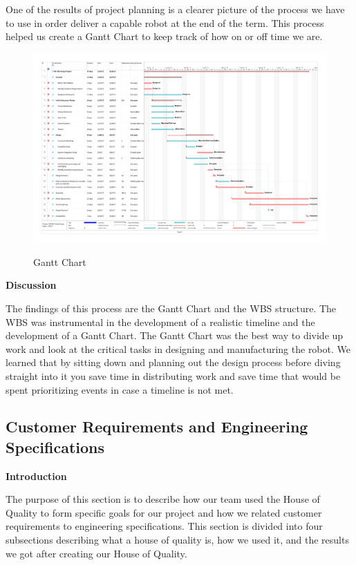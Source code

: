 \documentclass[12pt,letterpaper,titlepage]{article}
\begin{document}
One of the results of project planning is a clearer picture of the process we have to use in order deliver a capable robot at the end of the term. This process helped us create a Gantt Chart to keep track of how on or off time we are. 

\begin{figure}[h]
	\centering
	\includegraphics[width=\textwidth]{images/WBS}
	\label{fig:WBS}
	\caption{Gantt Chart}
\end{figure}

\smallskip\noindent\textbf{Discussion}

The findings of this process are the Gantt Chart and the WBS structure. The WBS was instrumental in the development of  a realistic timeline and the development of a Gantt Chart. The Gantt Chart was the best way to divide up work and look at the critical tasks in designing and manufacturing the robot. We learned that by sitting down and planning out the design process before diving straight into it you save time in distributing work and save time that would be spent prioritizing events in case a timeline is not met. 

\pagebreak
\subsection{Customer Requirements and Engineering Specifications}
\smallskip\noindent\textbf{Introduction}

The purpose of this section is to describe how our team used the House of Quality to form specific goals for our project and how we related customer requirements to engineering specifications. This section is divided into four subsections describing what a house of quality is, how we used it, and the results we got after creating our House of Quality.
\end{document}
